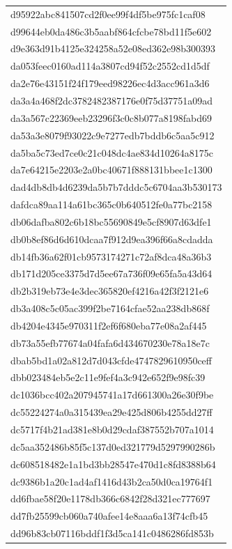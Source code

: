 \begin{tabular}{l}
d95922abc841507cd2f0ee99f4df5be975fc1caf08 \\
d99644eb0da486c3b5aabf864cfcbe78bd11f5e602 \\
d9e363d91b4125e324258a52e08ed362e98b300393 \\
da053feec0160ad114a3807cd94f52c2552cd1d5df \\
da2e76e43151f24f179eed98226ec4d3acc961a3d6 \\
da3a4a468f2dc3782482387176e0f75d37751a09ad \\
da3a567c22369eeb23296f3c0c8b077a8198fabd69 \\
da53a3e8079f93022c9e7277edb7bddb6c5aa5c912 \\
da5ba5c73ed7ce0c21c048dc4ae834d10264a8175c \\
da7e64215e2203e2a0bc40671f888131bbee1c1300 \\
dad4db8db4d6239da5b7b7dddc5c6704aa3b530173 \\
dafdca89aa114a61bc365c0b640512fe0a77bc2158 \\
db06dafba802c6b18bc55690849e5cf8907d63dfe1 \\
db0b8ef86d6d610dcaa7f912d9ea396f66a8cdadda \\
db14fb36a62f01cb9573174271c72af8dca48a36b3 \\
db171d205ce3375d7d5ee67a736f09e65fa5a43d64 \\
db2b319eb73e4e3dec365820ef4216a42f3f2121e6 \\
db3a408c5c05ac399f2be7164cfae52aa238db868f \\
db4204e4345e970311f2ef6f680eba77e08a2af445 \\
db73a55efb77674a04fafa6d434670230e78a18e7c \\
dbab5bd1a02a812d7d043cfde4747829610950ceff \\
dbb023484eb5e2c11e9fef4a3c942e652f9e98fc39 \\
dc1036bcc402a207945741a17d661300a26e30f9be \\
dc55224274a0a315439ea29e425d806b4255dd27ff \\
dc5717f4b21ad381e8b0d29cdaf387552b707a1014 \\
dc5aa352486b85f5c137d0ed321779d5297990286b \\
dc608518482e1a1bd3bb28547e470d1c8fd8388b64 \\
dc9386b1a20c1ad4af1416d43b2ca50d0ca19764f1 \\
dd6fbae58f20e1178db366c6842f28d321ec777697 \\
dd7fb25599cb060a740afee14e8aaa6a13f74cfb45 \\
dd96b83cb07116bddf1f3d5ca141c0486286fd853b \\

\end{tabular}
